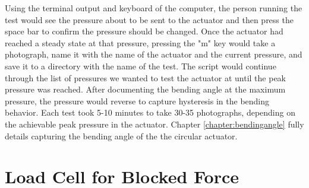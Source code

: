 Using the terminal output and keyboard of the computer, the person running the test would see the pressure about to be sent to the actuator and then press the space bar to confirm the pressure should be changed. Once the actuator had reached a steady state at that pressure, pressing the "m" key would take a photograph, name it with the name of the actuator and the current pressure, and save it to a directory with the name of the test. The script would continue through the list of pressures we wanted to test the actuator at until the peak pressure was reached. After documenting the bending angle at the maximum pressure, the pressure would reverse to capture hysteresis in the bending behavior. Each test took 5-10 minutes to take 30-35 photographs, depending on the achievable peak pressure in the actuator. Chapter \ref{chapter:bendingangle} fully details capturing the bending angle of the the circular actuator. 

\section{Load Cell for Blocked Force}


